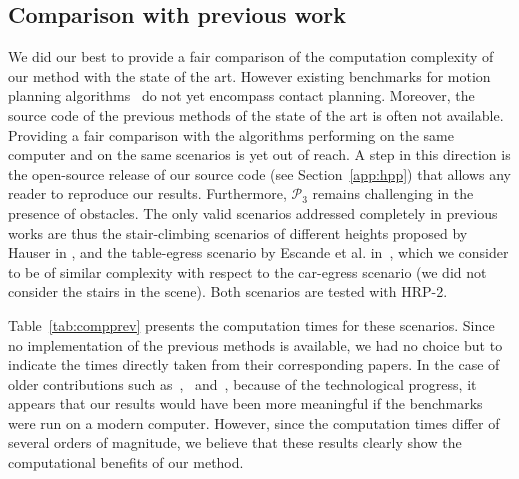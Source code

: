 \subsection{Comparison with previous work} \label{sec:compa}
We did our best to provide a fair comparison of the computation complexity of our method with the state of the art. 
However existing benchmarks for motion planning algorithms~\cite{moll2014extensible} do not yet encompass contact planning.
Moreover, the source code of the previous methods of the state of the art is often not available.
Providing a fair comparison with the algorithms performing on the same computer and on the same scenarios is yet out of reach.
A step in this direction is the open-source release of our source code (see Section~\ref{app:hpp}) that allows any reader to reproduce our results.
Furthermore, $\mathcal{P}_3$ remains challenging in the presence of obstacles. The only valid scenarios addressed completely in previous works are thus the stair-climbing scenarios of different heights proposed by Hauser in \cite{Hauser06usingmotion}, and the table-egress scenario by Escande et al. in~\cite{DBLP:conf/iser/EscandeKMG08}, which we consider to be of similar complexity with respect to the car-egress scenario (we did not consider the stairs in the scene). Both scenarios are tested with HRP-2.

Table~\ref{tab:compprev} presents the computation times for these scenarios. Since no implementation of the previous methods is available, we had no choice but to indicate the times directly taken from their corresponding papers.
In the case of older contributions such as~\cite{Hauser06usingmotion},~\cite{DBLP:conf/iser/EscandeKMG08} and~\cite{Bouyarmane2009}, because of the technological progress, it appears that our results would have been more meaningful if the benchmarks were run on a modern computer. However, since the computation times differ of several orders of magnitude, we believe that these results clearly show the computational benefits of our method.




